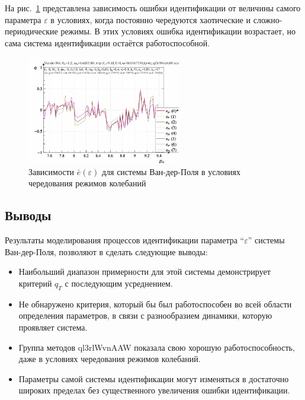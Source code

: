 На  рис.~\ref{atu:f:vdp_e_varepsilon_2} представлена зависимость ошибки идентификации
от величины самого параметра $\varepsilon$ в условиях,
когда постоянно чередуются хаотические и сложно-периодические режимы.
В этих условиях ошибка идентификации возрастает,
но сама система идентификации остаётся работоспособной.


\begin{figure}[ht!]
\begin{center}
  \includegraphics[width=0.60\textwidth]{p/cha/vdp/vdp_id2-p_p_e_ql3rlWvnAAW_scan.png}
\end{center}
  \caption{Зависимости $\bar{e}(\varepsilon)$ для системы Ван-дер-Поля в условиях чередования режимов колебаний}
\label{atu:f:vdp_e_varepsilon_2}
\end{figure}


\subsection{Выводы}  %

Результаты моделирования
процессов идентификации параметра ``$\varepsilon$''
системы Ван-дер-Поля,
позволяют в сделать следующие выводы:

\begin{itemize}

  \item
    Наибольший диапазон примерности для этой системы
    демонстрирует критерий $q_T$ с последующим усреднением.

  \item
    Не обнаружено критерия, который бы был работоспособен во всей
    области определения параметров, в связи с разнообразием динамики,
    которую проявляет система.

  \item
    Группа методов ql3rlWvnAAW показала свою хорошую работоспособность,
    даже в условиях чередования режимов колебаний.

  \item
    Параметры самой системы идентификации могут изменяться в достаточно широких
    пределах без существенного увеличения ошибки идентификации.

\end{itemize}





